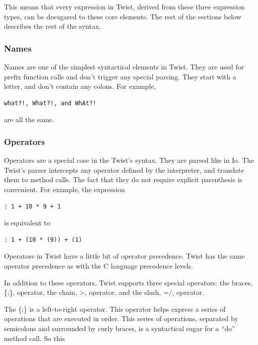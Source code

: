 This means that every expression in Twist, derived from these three expression types, can be desugared to these core elements. The rest of the sections below describes the rest of the syntax.

\subsubsection{Names}
\label{sec:names}

Names are one of the simplest syntactical elements in Twist. They are used for prefix function calls and don't trigger any special parsing. They start with a letter, and don't contain any colons. For example, 

\begin{verbatim}
what?!, What?!, and WhAt?! 
\end{verbatim} 

are all the same.

\subsubsection{Operators}
\label{sec:operators}

Operators are a special case in the Twist's syntax. They are parsed like in Io. The Twist's parser intercepts any operator defined by the interpreter, and translate them to method calls. The fact that they do not require explicit parenthesis is convenient. For example, the expression

\begin{verbatim}
: 1 + 10 * 9 + 1
\end{verbatim}

is equivalent to

\begin{verbatim}
: 1 + (10 * (9)) + (1)
\end{verbatim}

Operators in Twist have a little  bit of operator precedence. Twist has the same operator precedence as with the C language precedence levels.

In addition to these operators, Twist supports three special operators: the braces, \{;\}, operator, the chain, >, operator, and the slash, =/, operator.

The \{;\} is a left-to-right operator. This operator helps express a series of operations that are executed in order. This series of operations, separated by semicolons and surrounded by curly braces, is a syntactical sugar for a ``do'' method call. So this

